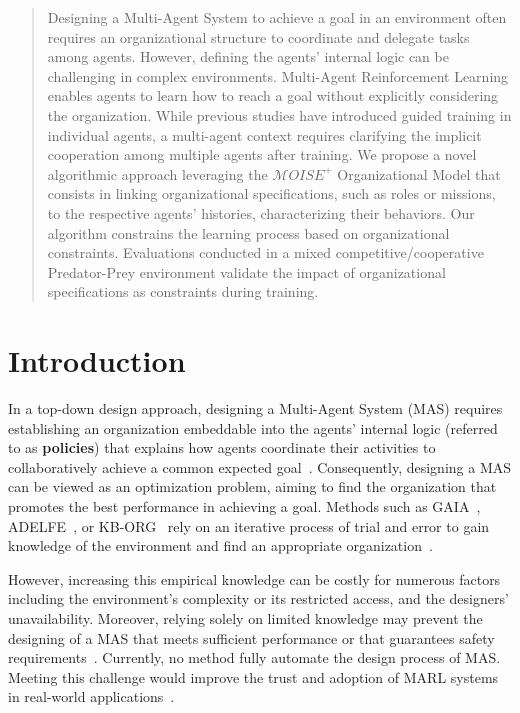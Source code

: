 \documentclass[runningheads]{llncs}
\theoremstyle{freethm}
\theoremstyle{proofoutline}
\begin{document}
\begin{abstract}

    Designing a Multi-Agent System to achieve a goal in an environment often requires an organizational structure to coordinate and delegate tasks among agents. However, defining the agents' internal logic can be challenging in complex environments. Multi-Agent Reinforcement Learning enables agents to learn how to reach a goal without explicitly considering the organization. While previous studies have introduced guided training in individual agents, a multi-agent context requires clarifying the implicit cooperation among multiple agents after training. We propose a novel algorithmic approach leveraging the $\mathcal{M}OISE^+$ Organizational Model that consists in linking organizational specifications, such as roles or missions, to the respective agents' histories, characterizing their behaviors. Our algorithm constrains the learning process based on organizational constraints. Evaluations conducted in a mixed competitive/cooperative Predator-Prey environment validate the impact of organizational specifications as constraints during training.

\end{abstract}


\section{Introduction}

In a top-down design approach, designing a Multi-Agent System (MAS) requires establishing an organization embeddable into the agents' internal logic (referred to as \textbf{policies}) that explains how agents coordinate their activities to collaboratively achieve a common expected goal~\cite{Picard2009}.
%
Consequently, designing a MAS can be viewed as an optimization problem, aiming to find the organization that promotes the best performance in achieving a goal. Methods such as GAIA~\cite{Wooldridge2000,Cernuzzi2014}, ADELFE~\cite{Mefteh2015}, or KB-ORG~\cite{Sims2008} rely on an iterative process of trial and error to gain knowledge of the environment and find an appropriate organization~\cite{Sims2008}.

However, increasing this empirical knowledge can be costly for numerous factors including the environment's complexity or its restricted access, and the designers' unavailability. Moreover, relying solely on limited knowledge may prevent the designing of a MAS that meets sufficient performance or that guarantees safety requirements~\cite{Mefteh2013}. Currently, no method fully automate the design process of MAS. Meeting this challenge would improve the trust and adoption of MARL systems in real-world applications~\cite{kok2006collaborative,omidshafiei2019learning}.
\end{document}
